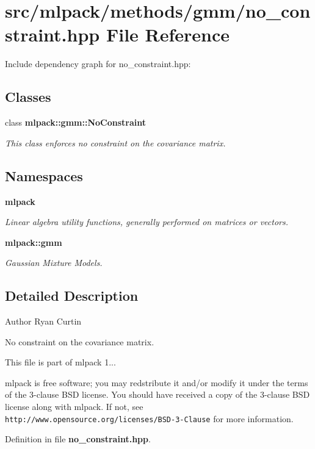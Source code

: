 \section{src/mlpack/methods/gmm/no\-\_\-constraint.hpp File Reference}
\label{no__constraint_8hpp}
Include dependency graph for no\-\_\-constraint.\-hpp\-:
\subsection*{Classes}
\begin{DoxyCompactItemize}
\item 
class {\bf mlpack\-::gmm\-::\-No\-Constraint}
\begin{DoxyCompactList}\small\item\em This class enforces no constraint on the covariance matrix. \end{DoxyCompactList}\end{DoxyCompactItemize}
\subsection*{Namespaces}
\begin{DoxyCompactItemize}
\item 
{\bf mlpack}
\begin{DoxyCompactList}\small\item\em Linear algebra utility functions, generally performed on matrices or vectors. \end{DoxyCompactList}\item 
{\bf mlpack\-::gmm}
\begin{DoxyCompactList}\small\item\em Gaussian Mixture Models. \end{DoxyCompactList}\end{DoxyCompactItemize}


\subsection{Detailed Description}
\begin{DoxyAuthor}{Author}
Ryan Curtin
\end{DoxyAuthor}
No constraint on the covariance matrix.

This file is part of mlpack 1...

mlpack is free software; you may redstribute it and/or modify it under the terms of the 3-\/clause B\-S\-D license. You should have received a copy of the 3-\/clause B\-S\-D license along with mlpack. If not, see {\tt http\-://www.\-opensource.\-org/licenses/\-B\-S\-D-\/3-\/\-Clause} for more information. 

Definition in file {\bf no\-\_\-constraint.\-hpp}.

